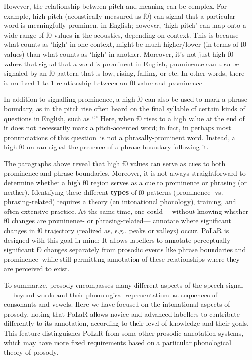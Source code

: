However, the relationship between pitch and meaning can be complex. For example, high pitch (acoustically measured as f0) can signal that a particular word is meaningfully prominent in English; however, ‘high pitch’ can map onto a wide range of f0 values in the acoustics, depending on context. This is because what counts as ‘high’ in one context, might be much higher\slash lower (in terms of f0 values) than what counts as ‘high’ in another. Moreover, it’s not just high f0 values that signal that a word is prominent in English; prominence can also be signaled by an f0 pattern that is low, rising, falling, or etc. In other words, there is no fixed 1-to-1 relationship between an f0 value and prominence.

In addition to signalling prominence, a high f0 can also be used to mark a phrase boundary, as in the pitch rise often heard on the final syllable of certain kinds of questions in English, such as “” Here, when f0 rises to a high value at the end of  it does not necessarily mark a pitch-accented word; in fact, in perhaps most pronunciations of this question,  is \uline{not} a phrasally-prominent word. Instead, a high f0 on  can signal the presence of a phrase boundary following it.

The paragraphs above reveal that high f0 values can serve as cues to both prominence and phrase boundaries. Moreover, it is not always straightforward to determine whether a high f0 region serves as a cue to prominence or phrasing (or neither). Identifying these different \textbf{types} of f0 patterns (prominence- vs. phrasing-related) requires a theory (an intonational phonology), training, and often extensive practice. At the same time, one could —without knowing whether f0 changes are prominence- or phrasing-related— annotate where significant changes in f0 trajectory (realized as, e.g., peaks or valleys) occur. PoLaR is designed with this goal in mind: It allows labellers to annotate perceptually-significant f0 changes separately from prosodic events like phrase boundaries and prominence, while still permitting annotation of these relationships where they are perceived to exist.

To summarize, prosody encompasses many different aspects of the speech signal — beyond words and their phonological representations as sequences of consonants and vowels. Here we have focused on the intonational aspects of prosody, noting that PoLaR allows novice and advanced labellers to contribute differently to its annotation, according to their level of knowledge and their goals. This feature distinguishes PoLaR from some other prosodic annotation systems, which may have more fixed requirements based on a particular phonological theory of prosody.

